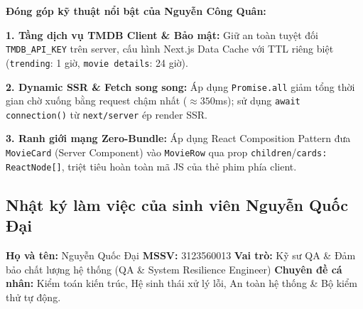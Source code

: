 \documentclass[12pt,a4paper]{extarticle}
\begin{document}
\noindent \textbf{Đóng góp kỹ thuật nổi bật của Nguyễn Công Quân:}

\textbf{1. Tầng dịch vụ TMDB Client \& Bảo mật:} Giữ an toàn tuyệt đối \texttt{TMDB\_API\_KEY} trên server, cấu hình Next.js Data Cache với TTL riêng biệt (\texttt{trending}: 1 giờ, \texttt{movie details}: 24 giờ).

\textbf{2. Dynamic SSR \& Fetch song song:} Áp dụng \texttt{Promise.all} giảm tổng thời gian chờ xuống bằng request chậm nhất ($\approx 350$ms); sử dụng \texttt{await connection()} từ \texttt{next/server} ép render SSR.

\textbf{3. Ranh giới mạng Zero-Bundle:} Áp dụng React Composition Pattern đưa \texttt{MovieCard} (Server Component) vào \texttt{MovieRow} qua prop \texttt{children}/\texttt{cards: ReactNode[]}, triệt tiêu hoàn toàn mã JS của thẻ phim phía client.

\newpage
\subsection{Nhật ký làm việc của sinh viên Nguyễn Quốc Đại}

\noindent \textbf{Họ và tên:} Nguyễn Quốc Đại \hspace{1cm} \textbf{MSSV:} 3123560013 \newline
\textbf{Vai trò:} Kỹ sư QA \& Đảm bảo chất lượng hệ thống (QA \& System Resilience Engineer) \newline
\textbf{Chuyên đề cá nhân:} Kiểm toán kiến trúc, Hệ sinh thái xử lý lỗi, An toàn hệ thống \& Bộ kiểm thử tự động.
\end{document}
